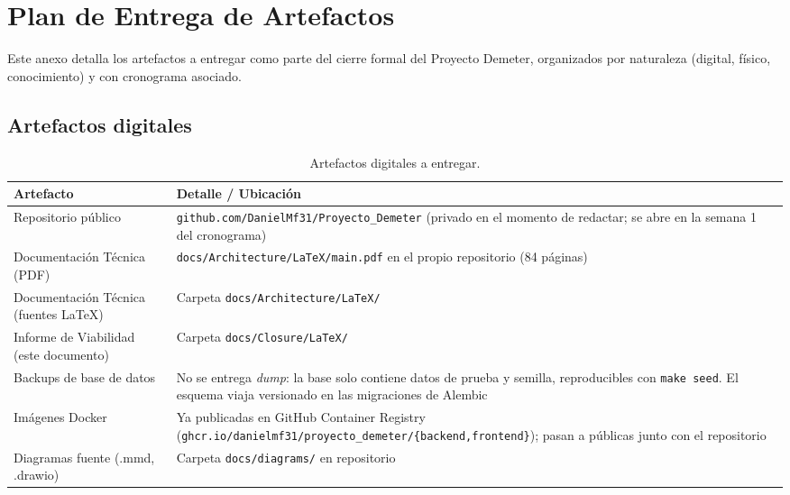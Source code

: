 \chapter{Plan de Entrega de Artefactos}
\label{anx:plan_entrega}

Este anexo detalla los artefactos a entregar como parte del cierre
formal del Proyecto Demeter, organizados por naturaleza (digital,
f\'isico, conocimiento) y con cronograma asociado.

\section{Artefactos digitales}

\begin{table}[H]
    \centering
    \caption{Artefactos digitales a entregar.}
    \label{tab:digital}
    \begin{tabular}{p{4.5cm}p{8cm}}
        \toprule
        \textbf{Artefacto} & \textbf{Detalle / Ubicaci\'on} \\
        \midrule
        Repositorio p\'ublico & \texttt{github.com/DanielMf31/Proyecto\_Demeter} (privado en el momento de redactar; se abre en la semana 1 del cronograma) \\
        Documentaci\'on T\'ecnica (PDF) & \texttt{docs/Architecture/LaTeX/main.pdf} en el propio repositorio (84 p\'aginas) \\
        Documentaci\'on T\'ecnica (fuentes LaTeX) & Carpeta \texttt{docs/Architecture/LaTeX/} \\
        Informe de Viabilidad (este documento) & Carpeta \texttt{docs/Closure/LaTeX/} \\
        Backups de base de datos & No se entrega \textit{dump}: la base solo contiene datos de prueba y semilla, reproducibles con \texttt{make seed}. El esquema viaja versionado en las migraciones de Alembic \\
        Im\'agenes Docker & Ya publicadas en GitHub Container Registry (\texttt{ghcr.io/danielmf31/proyecto\_demeter/\{backend,frontend\}}); pasan a p\'ublicas junto con el repositorio \\
        Diagramas fuente (.mmd, .drawio) & Carpeta \texttt{docs/diagrams/} en repositorio \\
        \bottomrule
    \end{tabular}
\end{table}

